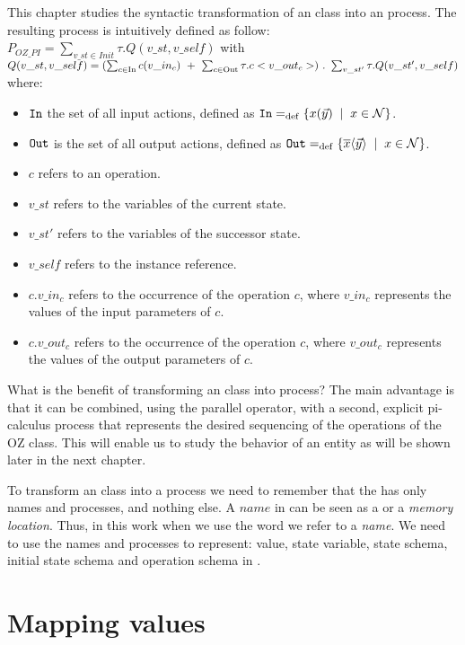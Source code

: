 This chapter studies the syntactic transformation of an \oz{} class into an \picalc{} process. The resulting process is intuitively defined as follow:\\
$P_{OZ\_PI} = \sum_{v\_st\in Init}^{} \tau. Q(v\_st,v\_self)$ with
$\\Q(v\_st,v\_self) = (\sum_{c\in \text{In}}^{} c(v\_in_{c}) \ +\ \sum_{c\in \text{Out}}^{} \tau.c<v\_out_{c}>)\ .\ \sum_{v\_st'}^{} \tau.Q(v\_st',v\_self)$
where:
\begin{itemize}
\item $\mathtt{In}$ the set of all input actions, defined as $\inA\define\set[x\in\names]{\inp{x}{\vec{y}}}$.
\item $\mathtt{Out}$ is the set of all output actions, defined as $\outA\define\set[x\in\names]{\out{x}{\vec{y}}}$.
\item $c$ refers to an operation.
\item $v\_st$ refers to the variables of the current state.
\item $v\_st'$ refers to the variables of the successor state.
\item $v\_self$ refers to the instance reference.
\item $c.v\_in_{c}$ refers to the occurrence of the operation $c$, where $v\_in_{c}$ represents the values of the input parameters of $c$.
\item $c.v\_out_{c}$ refers to the occurrence of the operation $c$, where $v\_out_{c}$ represents the values of the output parameters of $c$.
\end{itemize}

What is the benefit of transforming an \oz{} class into \picalc{} process? The main advantage is that it can be combined, using the
parallel operator, with a second, explicit pi-calculus
process that represents the desired sequencing of the operations
of the OZ class. This will enable us to study the behavior of an entity as will be shown later in the next chapter.

To transform an \oz{} class into a \picalc{} process we need to remember that the \picalc{} has only names and processes, and nothing else. A $name$ in \picalc{} can be seen as a  or a \textit{memory location}. Thus, in this work when we use the word  we refer to a \picalc{} \textit{name}. We need to use the names and processes to represent: value, state variable, state schema, initial state schema and operation schema in \picalc{}.
\section{Mapping values}
\label{sec_tra_mapping_values}



